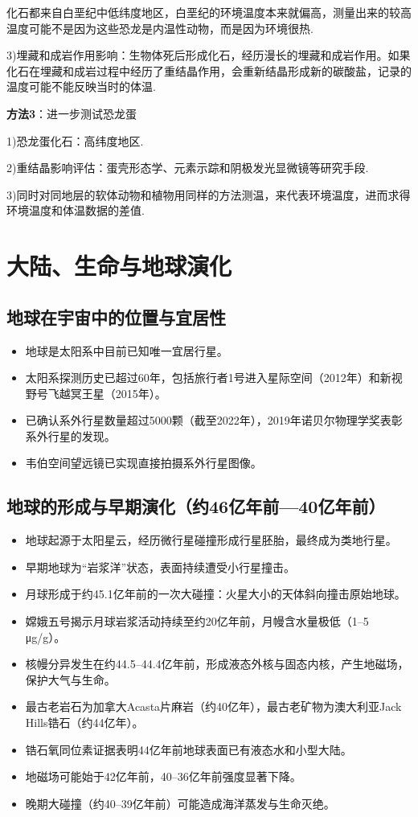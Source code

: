 \documentclass[12pt,a4paper]{article}
\begin{document}
	化石都来自白垩纪中低纬度地区，白垩纪的环境温度本来就偏高，测量出来的较高温度可能不是因为这些恐龙是内温性动物，而是因为环境很热.
	
	3)埋藏和成岩作用影响：生物体死后形成化石，经历漫长的埋藏和成岩作用。如果化石在埋藏和成岩过程中经历了重结晶作用，会重新结晶形成新的碳酸盐，记录的温度可能不能反映当时的体温.
	
	\textbf{方法3}：进一步测试恐龙蛋
	
	1)恐龙蛋化石：高纬度地区.
	
	2)重结晶影响评估：蛋壳形态学、元素示踪和阴极发光显微镜等研究手段.
	
	3)同时对同地层的软体动物和植物用同样的方法测温，来代表环境温度，进而求得环境温度和体温数据的差值.
	
	\section{大陆、生命与地球演化}
	
	\subsection{地球在宇宙中的位置与宜居性}
	\begin{itemize}
		\item 地球是太阳系中目前已知唯一宜居行星。
		\item 太阳系探测历史已超过60年，包括旅行者1号进入星际空间（2012年）和新视野号飞越冥王星（2015年）。
		\item 已确认系外行星数量超过5000颗（截至2022年），2019年诺贝尔物理学奖表彰系外行星的发现。
		\item 韦伯空间望远镜已实现直接拍摄系外行星图像。
	\end{itemize}
	
	\subsection{地球的形成与早期演化（约46亿年前—40亿年前）}
	\begin{itemize}
		\item 地球起源于太阳星云，经历微行星碰撞形成行星胚胎，最终成为类地行星。
		\item 早期地球为“岩浆洋”状态，表面持续遭受小行星撞击。
		\item 月球形成于约45.1亿年前的一次大碰撞：火星大小的天体斜向撞击原始地球。
		\item 嫦娥五号揭示月球岩浆活动持续至约20亿年前，月幔含水量极低（1–5 μg/g）。
		\item 核幔分异发生在约44.5–44.4亿年前，形成液态外核与固态内核，产生地磁场，保护大气与生命。
		\item 最古老岩石为加拿大Acasta片麻岩（约40亿年），最古老矿物为澳大利亚Jack Hills锆石（约44亿年）。
		\item 锆石氧同位素证据表明44亿年前地球表面已有液态水和小型大陆。
		\item 地磁场可能始于42亿年前，40–36亿年前强度显著下降。
		\item 晚期大碰撞（约40–39亿年前）可能造成海洋蒸发与生命灭绝。
	\end{itemize}
	
\end{document}
